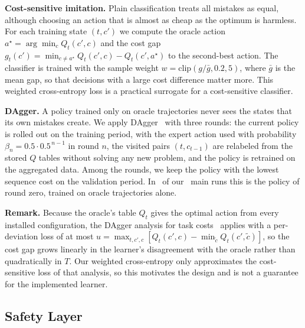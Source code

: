 \documentclass[5p,times]{elsarticle}
\begin{document}
\textbf{Cost-sensitive imitation.} Plain classification treats all mistakes as equal, although choosing an action that is almost as cheap as the optimum is harmless. For each training state $(t,c')$ we compute the oracle action $a^\star=\arg\min_c Q_t(c',c)$ and the cost gap $g_t(c')=\min_{c\neq a^\star}Q_t(c',c)-Q_t(c',a^\star)$ to the second-best action. The classifier is trained with the sample weight $w=\mathrm{clip}(g/\bar g,0.2,5)$, where $\bar g$ is the mean gap, so that decisions with a large cost difference matter more. This weighted cross-entropy loss is a practical surrogate for a cost-sensitive classifier.

\textbf{DAgger.} A policy trained only on oracle trajectories never sees the states that its own mistakes create. We apply DAgger~\cite{ross2011dagger} with three rounds: the current policy is rolled out on the training period, with the expert action used with probability $\beta_n=0.5\cdot0.5^{\,n-1}$ in round $n$, the visited pairs $(t,c_{t-1})$ are relabeled from the stored $Q$ tables without solving any new problem, and the policy is retrained on the aggregated data. Among the rounds, we keep the policy with the lowest sequence cost on the validation period. In \daggerRoundZero\ of our \daggerRuns\ main runs this is the policy of round zero, trained on oracle trajectories alone.

\textbf{Remark.} Because the oracle's table $Q_t$ gives the optimal action from every installed configuration, the DAgger analysis for task costs~\cite{ross2011dagger} applies with a per-deviation loss of at most $u=\max_{t,c',c}[Q_t(c',c)-\min_{\tilde c}Q_t(c',\tilde c)]$, so the cost gap grows linearly in the learner's disagreement with the oracle rather than quadratically in $T$. Our weighted cross-entropy only approximates the cost-sensitive loss of that analysis, so this motivates the design and is not a guarantee for the implemented learner.

\subsection{Safety Layer}
\end{document}

